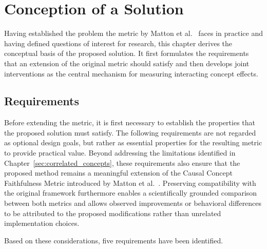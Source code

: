 \chapter{Conception of a Solution}
\label{sec:conception}
Having established the problem the metric by Matton et al.~\cite{mattonWalkTalkMeasuring2024} faces in practice and having defined questions of interest for research, this chapter derives the conceptual basis of the proposed solution. It first formulates the requirements that an extension of the original metric should satisfy and then develops joint interventions as the central mechanism for measuring interacting concept effects.

\section{Requirements}
\label{sec:requirements}
Before extending the metric, it is first necessary to establish the properties that the proposed solution must satisfy. The following requirements are not regarded as optional design goals, but rather as essential properties for the resulting metric to provide practical value. Beyond addressing the limitations identified in Chapter~\ref{sec:correlated_concepts}, these requirements also ensure that the proposed method remains a meaningful extension of the Causal Concept Faithfulness Metric introduced by Matton et al.~\cite{mattonWalkTalkMeasuring2024}. Preserving compatibility with the original framework furthermore enables a scientifically grounded comparison between both metrics and allows observed improvements or behavioral differences to be attributed to the proposed modifications rather than unrelated implementation choices.

Based on these considerations, five requirements have been identified.

